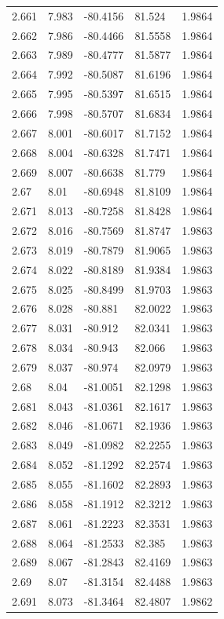 \begin{tabular}{lllll}
2.661 & 7.983 & -80.4156 & 81.524 & 1.9864 \\
2.662 & 7.986 & -80.4466 & 81.5558 & 1.9864 \\
2.663 & 7.989 & -80.4777 & 81.5877 & 1.9864 \\
2.664 & 7.992 & -80.5087 & 81.6196 & 1.9864 \\
2.665 & 7.995 & -80.5397 & 81.6515 & 1.9864 \\
2.666 & 7.998 & -80.5707 & 81.6834 & 1.9864 \\
2.667 & 8.001 & -80.6017 & 81.7152 & 1.9864 \\
2.668 & 8.004 & -80.6328 & 81.7471 & 1.9864 \\
2.669 & 8.007 & -80.6638 & 81.779 & 1.9864 \\
2.67 & 8.01 & -80.6948 & 81.8109 & 1.9864 \\
2.671 & 8.013 & -80.7258 & 81.8428 & 1.9864 \\
2.672 & 8.016 & -80.7569 & 81.8747 & 1.9863 \\
2.673 & 8.019 & -80.7879 & 81.9065 & 1.9863 \\
2.674 & 8.022 & -80.8189 & 81.9384 & 1.9863 \\
2.675 & 8.025 & -80.8499 & 81.9703 & 1.9863 \\
2.676 & 8.028 & -80.881 & 82.0022 & 1.9863 \\
2.677 & 8.031 & -80.912 & 82.0341 & 1.9863 \\
2.678 & 8.034 & -80.943 & 82.066 & 1.9863 \\
2.679 & 8.037 & -80.974 & 82.0979 & 1.9863 \\
2.68 & 8.04 & -81.0051 & 82.1298 & 1.9863 \\
2.681 & 8.043 & -81.0361 & 82.1617 & 1.9863 \\
2.682 & 8.046 & -81.0671 & 82.1936 & 1.9863 \\
2.683 & 8.049 & -81.0982 & 82.2255 & 1.9863 \\
2.684 & 8.052 & -81.1292 & 82.2574 & 1.9863 \\
2.685 & 8.055 & -81.1602 & 82.2893 & 1.9863 \\
2.686 & 8.058 & -81.1912 & 82.3212 & 1.9863 \\
2.687 & 8.061 & -81.2223 & 82.3531 & 1.9863 \\
2.688 & 8.064 & -81.2533 & 82.385 & 1.9863 \\
2.689 & 8.067 & -81.2843 & 82.4169 & 1.9863 \\
2.69 & 8.07 & -81.3154 & 82.4488 & 1.9863 \\
2.691 & 8.073 & -81.3464 & 82.4807 & 1.9862 \\

\end{tabular}
